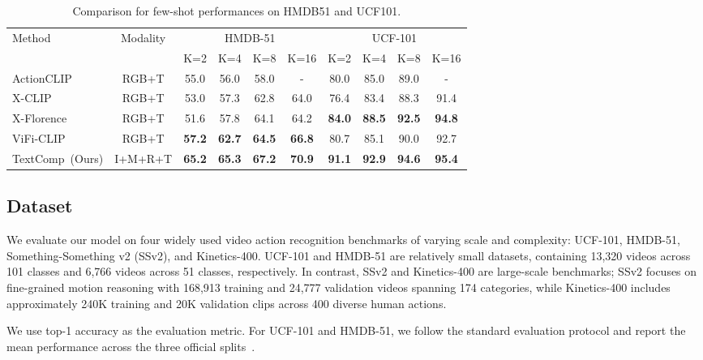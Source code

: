 \documentclass[letterpaper]{article} %
\newcommand{\methodname}{TextComp}
\begin{document}
\begin{table}[tb]
\centering
\caption{Comparison for few-shot performances on HMDB51 and UCF101.}
\label{tab:fewshothmdb}
\begin{tabular}{lccccccccc}
\toprule
\multirow{2}{*}{Method} & \multirow{2}{*}{Modality} & \multicolumn{4}{c}{HMDB-51} & \multicolumn{4}{c}{UCF-101} \\
\cmidrule(lr){3-6} \cmidrule(lr){7-10}
& & K=2 & K=4 & K=8 & K=16 & K=2 & K=4 & K=8 & K=16 \\
\midrule
ActionCLIP~\cite{wang2021actionclipnewparadigmvideo} & RGB+T & 55.0 & 56.0 & 58.0 & - & 80.0 & 85.0 & 89.0 & - \\
X-CLIP~\cite{ni2022expanding} & RGB+T & 53.0 & 57.3 & 62.8 & 64.0 & 76.4 & 83.4 & 88.3 & 91.4 \\
X-Florence~\cite{ni2022expanding} & RGB+T & 51.6 & 57.8 & 64.1 & 64.2 & \textbf{84.0} & \textbf{88.5} & \textbf{92.5} & \textbf{94.8} \\
ViFi-CLIP~\cite{rasheed2023fine} & RGB+T & \textbf{57.2} & \textbf{62.7} & \textbf{64.5} & \textbf{66.8} & 80.7 & 85.1 & 90.0 & 92.7 \\
\midrule
\methodname~(Ours) & I+M+R+T & \textbf{65.2} & \textbf{65.3} & \textbf{67.2} & \textbf{70.9} & \textbf{91.1} & \textbf{92.9} & \textbf{94.6} & \textbf{95.4} \\
\bottomrule
\end{tabular}%
\end{table}


\subsection{Dataset}
We evaluate our model on four widely used video action recognition benchmarks of varying scale and complexity: UCF-101, HMDB-51, Something-Something v2 (SSv2), and Kinetics-400. UCF-101 and HMDB-51 are relatively small datasets, containing 13,320 videos across 101 classes and 6,766 videos across 51 classes, respectively. In contrast, SSv2 and Kinetics-400 are large-scale benchmarks; SSv2 focuses on fine-grained motion reasoning with 168,913 training and 24,777 validation videos spanning 174 categories, while Kinetics-400 includes approximately 240K training and 20K validation clips across 400 diverse human actions.

We use top-1 accuracy as the evaluation metric. For UCF-101 and HMDB-51, we follow the standard evaluation protocol and report the mean performance across the three official splits~\cite{wu2018compressed,li2023compressed}.
\end{document}
